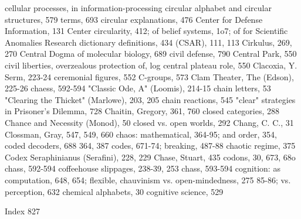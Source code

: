 cellular processes, in information-processing    circular alphabet and circular structures, 579
 terms, 693                                      circular explanations, 476
Center for Defense Information, 131 Center       circularity, 412; of belief systems, 1o7; of
 for Scientific Anomalies Research                dictionary definitions, 434
(CSAR), 111, 113                                 Cirkulus, 269, 270
Central Dogma of molecular biology, 689          civil defense, 790
 Central Park, 550                               civil liberties, overzealous protection of, log
central plateau role, 550                        Clacoxia, Y. Serm, 223-24
ceremonial figures, 552 C-groups, 573            Clam Theater, The (Edson), 225-26
chaess, 592-594                                  "Classic Ode, A" (Loomis), 214-15
chain letters, 53                                "Clearing the Thicket" (Marlowe), 203, 205
chain reactions, 545                             "clear" strategies in Prisoner's Dilemma, 728
Chaitin, Gregory, 361, 760                       closed categories, 288
Chance and Necessity (Monod), 50                 closed vs. open worlds, 292
Chang, C. C., 31                                 Clossman, Gray, 547, 549, 660
chaos: mathematical, 364-95; and order, 354,     coded decoders, 688
 364, 387                                        codes, 671-74; breaking, 487-88
chaotic regime, 375                              Codex Seraphinianus (Serafini), 228, 229
Chase, Stuart, 435                               codons, 30, 673, 68o
chass, 592-594                                   coffeehouse slippages, 238-39, 253
chass, 593-594                                   cognition: as computation, 648, 654; flexible,
chauvinism vs. open-mindedness, 275               85-86; vs. perception, 632
 chemical alphabets, 30                          cognitive science, 529

 Index                                                                                      827

